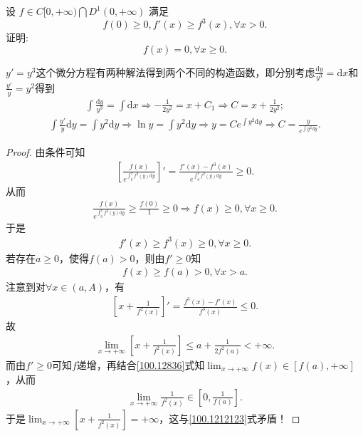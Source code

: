 \documentclass[../../main.tex]{subfiles}
\begin{document}
\begin{example}
设 \( f \in C[0,+\infty) \bigcap D^1(0,+\infty) \) 满足
\[
f(0) \geqslant 0, f'(x) \geqslant f^3(x), \forall x > 0.
\]
证明:
\[
f(x) = 0, \forall x \geqslant 0.
\]
\end{example}
\begin{note}
$y' = y^3$这个微分方程有两种解法得到两个不同的构造函数，即分别考虑$\frac{\mathrm{d}y}{y^3}=\mathrm{d}x$和$\frac{y'}{y}=y^2$得到
\begin{align*}
\int{\frac{\mathrm{d}y}{y^3}}=\int{\mathrm{d}x}\Longrightarrow -\frac{1}{2y^2}=x+C_1\Longrightarrow C=x+\frac{1}{2y^2};
\end{align*}
\begin{align*}
\int{\frac{y'}{y}\mathrm{d}y}=\int{y^2\mathrm{d}y}\Longrightarrow \ln y=\int{y^2\mathrm{d}y}\Longrightarrow y=Ce^{\int{y^2\mathrm{d}y}}\Longrightarrow C=\frac{y}{e^{\int{y^2\mathrm{d}y}}}.
\end{align*}
\end{note}
\begin{proof}
由条件可知
\begin{align*}
\left[ \frac{f\left( x \right)}{e^{\int_0^x{f^2\left( y \right) \mathrm{d}y}}} \right]' =\frac{f' \left( x \right) -f^3\left( x \right)}{e^{\int_0^x{f^2\left( y \right) \mathrm{d}y}}}\geqslant 0.
\end{align*}
从而
\begin{align*}
\frac{f\left( x \right)}{e^{\int_0^x{f^2\left( y \right) \mathrm{d}y}}}\geqslant \frac{f\left( 0 \right)}{1}\geqslant 0\Longrightarrow f\left( x \right) \geqslant 0,\forall x\geqslant 0.
\end{align*}
于是
\begin{align*}
f' \left( x \right) \geqslant f^3\left( x \right) \geqslant 0,\forall x\geqslant 0.
\end{align*}
若存在$a\geqslant 0$，使得$f\left( a \right) >0$，则由$f' \geqslant 0$知
\begin{align}
f\left( x \right) \geqslant f\left( a \right) >0,\forall x>a. \label{100.12836}
\end{align}
注意到对$\forall x\in \left( a,A \right)$，有
\begin{align*}
\left[ x+\frac{1}{f^2\left( x \right)} \right]' =\frac{f^3\left( x \right) -f' \left( x \right)}{f^3\left( x \right)}\leqslant 0.
\end{align*}
故
\begin{align}
\lim_{x\rightarrow +\infty}\left[ x+\frac{1}{f^2\left( x \right)} \right] \leqslant a+\frac{1}{2f^2\left( a \right)}<+\infty . \label{100.1212123}
\end{align}
而由$f' \geqslant 0$可知$f$递增，再结合\eqref{100.12836}式知$\lim_{x\rightarrow +\infty}f\left( x \right) \in \left[ f\left( a \right) ,+\infty \right]$，从而
\begin{align*}
\lim_{x\rightarrow +\infty}\frac{1}{f^2\left( x \right)}\in \left[ 0,\frac{1}{f\left( a \right)} \right] .
\end{align*}
于是$\lim_{x\rightarrow +\infty}\left[ x+\frac{1}{f^2\left( x \right)} \right] =+\infty$，这与\eqref{100.1212123}式矛盾！
\end{proof}
\end{document}
